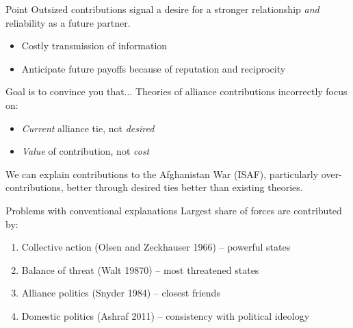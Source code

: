 \documentclass[11pt]{beamer}
\begin{document}
\begin{frame}{Point}
Outsized contributions signal a desire for a stronger relationship \textit{and} reliability as a future partner.

\begin{itemize}
  \item Costly transmission of information
  \item Anticipate future payoffs because of reputation and reciprocity
\end{itemize}

\end{frame}

\begin{frame}{Goal is to convince you that...}
Theories of alliance contributions incorrectly focus on:

\begin{itemize}
  \item \textit{Current} alliance tie, not \textit{desired}
  \item \textit{Value} of contribution, not \textit{cost}
\end{itemize}

We can explain contributions to the Afghanistan War (ISAF), particularly over-contributions, better through desired ties better than existing theories.

\end{frame}

\begin{frame}{Problems with conventional explanations}
  Largest share of forces are contributed by:
  \begin{enumerate}
    \item Collective action (Olsen and Zeckhauser 1966) -- powerful states
    \item Balance of threat (Walt 19870) -- most threatened states
    \item Alliance politics (Snyder 1984) -- closest friends
    \item Domestic politics (Ashraf 2011) -- consistency with political ideology
  \end{enumerate}
\end{frame}
\end{document}

